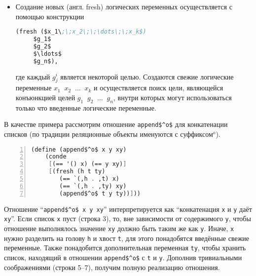 \begin{itemize}
\item Создание новых (англ. fresh) логических переменных осуществляется с помощью конструкции

\begin{lstlisting}[language=scheme]
   (fresh ($x_1\;\;x_2\;\;\dots\;\;x_k$)
     $g_1$
     $g_2$
     $\ldots$
     $g_n$),
\end{lstlisting}

где каждый $g^i_j$ является некоторой целью. Создаются свежие логические переменные  $x_1\;\;x_2\;\;\dots\;\;x_k$ и
осуществляется поиск цели, являющейся конъюнкцией целей $g_1\;\;g_2\;\;\dots\;\;g_n$, внутри которых могут использоваться только что введенные логические переменные.
\end{itemize}

В качестве примера рассмотрим отношение  \lstinline|append$^o$| для конкатенации списков (по традиции реляционные объекты именуются с суффиксом$^o$).

\begin{lstlisting}[mathescape=true,language=scheme,numbers=left,numberstyle=\small,stepnumber=1,numbersep=-5pt]
  (define (append$^o$ x y xy)
    (conde
     [(== '() x) (== y xy)]
     [(fresh (h t ty)
        (== `(,h . ,t) x)
        (== `(,h . ,ty) xy)
        (append$^o$ t y ty))]))
\end{lstlisting}

Отношение \enquote{\lstinline|append$^o$ x y xy|} интерпретируется как \enquote{конкатенация  \lstinline|x| и \lstinline|y| даёт \lstinline|xy|}.
Если список \lstinline|x| пуст (строка 3), то, вне зависимости от содержимого \lstinline|y|, чтобы отношение выполнялось значение \lstinline|xy| должно быть таким же как \lstinline|y|.
Иначе, \lstinline|x| нужно разделить на голову \lstinline|h| и хвост \lstinline|t|, для этого понадобятся введённые свежие переменные.
Также понадобится дополнительная переменная \lstinline|ty|, чтобы хранить список, находящий в отношении \lstinline|append$^o$| с \lstinline|t| и \lstinline|y|.
Дополнив тривиальными соображениями (строки 5--7), получим полную реализацию отношения.


